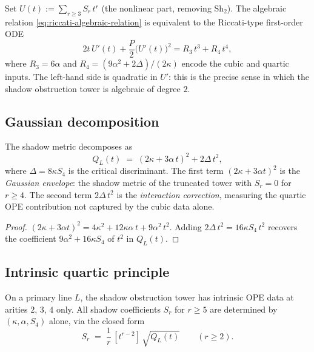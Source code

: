 \begin{remark}
\label{rem:riccati-ode}
Set $U(t) := \sum_{r \geq 3} S_r \, t^r$ (the nonlinear part,
removing $\mathrm{Sh}_2$). The algebraic relation
\eqref{eq:riccati-algebraic-relation} is equivalent to the
Riccati-type first-order ODE
\begin{equation}
\label{eq:riccati-ode}
 2t\,U'(t) + \frac{P}{2}\bigl(U'(t)\bigr)^2
 = R_3\,t^3 + R_4\,t^4,
\end{equation}
where $R_3 = 6\alpha$ and
$R_4 = (9\alpha^2 + 2\Delta)/(2\kappa)$ encode the cubic
and quartic inputs. The left-hand side is quadratic in $U'$:
this is the precise sense in which the shadow obstruction tower is algebraic
of degree $2$.
\end{remark}

\subsection{Gaussian decomposition}

\begin{corollary}
\label{cor:gaussian-decomposition}
The shadow metric decomposes as
\begin{equation}
\label{eq:gaussian-decomposition}
 Q_L(t) \;=\; (2\kappa + 3\alpha\,t)^2 + 2\Delta\,t^2,
\end{equation}
where $\Delta = 8\kappa S_4$ is the critical discriminant.
The first term $(2\kappa + 3\alpha t)^2$ is the \emph{Gaussian
envelope}: the shadow metric of the truncated tower with
$S_r = 0$ for $r \geq 4$. The second term $2\Delta\,t^2$
is the \emph{interaction correction}, measuring the quartic
OPE contribution not captured by the cubic data alone.
\end{corollary}

\begin{proof}
$(2\kappa + 3\alpha t)^2 = 4\kappa^2 + 12\kappa\alpha\,t
+ 9\alpha^2\,t^2$. Adding $2\Delta\,t^2 = 16\kappa S_4\,t^2$
recovers the coefficient $9\alpha^2 + 16\kappa S_4$ of $t^2$
in $Q_L(t)$.
\end{proof}

\subsection{Intrinsic quartic principle}

\begin{corollary}
\label{cor:intrinsic-quartic}
On a primary line $L$, the shadow obstruction tower has intrinsic OPE data
at arities $2$, $3$, $4$ only. All shadow coefficients $S_r$
for $r \geq 5$ are determined by $(\kappa, \alpha, S_4)$
alone, via the closed form
\begin{equation}
\label{eq:shadow-from-closed-form}
 S_r \;=\; \frac{1}{r}\,[t^{r-2}]\,\sqrt{Q_L(t)}
 \qquad (r \geq 2).
\end{equation}
\end{corollary}

